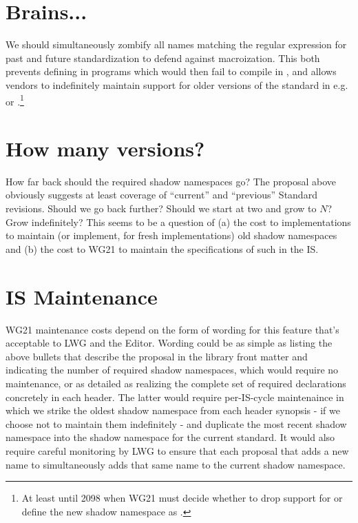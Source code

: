 \section{Brains...}
We should simultaneously zombify all names matching the regular expression
 for past and future standardization to defend against
macroization. This both prevents defining  in  programs
which would then fail to compile in , and allows vendors to indefinitely
maintain support for older versions of the standard in e.g. 
or .\footnote{At least until 2098 when WG21 must decide
whether to drop support for  or define the new shadow namespace
as .}

\section{How many versions?}
How far back should the required shadow namespaces go? The proposal above
obviously suggests at least coverage of ``current'' and ``previous'' Standard
revisions. Should we go back further? Should we start at two and grow to $N$?
Grow indefinitely? This seems to be a question of (a) the cost to
implementations to maintain (or implement, for fresh implementations) old shadow
namespaces and (b) the cost to WG21 to maintain the specifications of such in
the IS.

\section{IS Maintenance}
WG21 maintenance costs depend on the form of wording for this feature that's
acceptable to LWG and the Editor. Wording could be as simple as listing the
above bullets that describe the proposal in the library front matter and
indicating the number of required shadow namespaces,
which would require no maintenance,
or as detailed as realizing the complete set of required declarations concretely
in each header. The latter would require per-IS-cycle maintenaince in which we
strike the oldest shadow namespace from each header synopsis - if we choose not
to maintain them indefinitely - and duplicate the most recent shadow namespace
into the shadow namespace for the current standard. It would also require
careful monitoring by LWG to ensure that each proposal that adds a new name to
 simultaneously adds that same name to the current shadow namespace.

